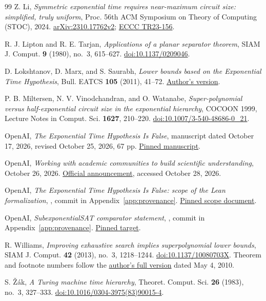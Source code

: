 \documentclass[11pt,reqno]{amsart}
\numberwithin{equation}{section}
\theoremstyle{plain}
\theoremstyle{definition}
\theoremstyle{remark}
\begin{document}
\begin{thebibliography}{99}
Z. Li, \emph{Symmetric exponential time requires near-maximum circuit size:
simplified, truly uniform}, Proc. 56th ACM Symposium on Theory of Computing
(STOC), 2024.
\href{https://arxiv.org/abs/2310.17762v2}{arXiv:2310.17762v2};
\href{https://eccc.weizmann.ac.il/report/2023/156/}{ECCC TR23-156}.

R. J. Lipton and R. E. Tarjan, \emph{Applications of a planar separator
theorem}, SIAM J. Comput. \textbf{9} (1980), no.~3, 615--627.
\href{https://doi.org/10.1137/0209046}{doi:10.1137/0209046}.

D. Lokshtanov, D. Marx, and S. Saurabh, \emph{Lower bounds based on the
Exponential Time Hypothesis}, Bull. EATCS \textbf{105} (2011), 41--72.
\href{https://sites.cs.ucsb.edu/~daniello/papers/surveyETH.pdf}{Author's version}.

P. B. Miltersen, N. V. Vinodchandran, and O. Watanabe,
\emph{Super-polynomial versus half-exponential circuit size in the
exponential hierarchy}, COCOON 1999, Lecture Notes in Comput. Sci.
\textbf{1627}, 210--220.
\href{https://doi.org/10.1007/3-540-48686-0_21}{doi:10.1007/3-540-48686-0\_21}.

OpenAI, \emph{The Exponential Time Hypothesis Is False}, manuscript dated
October 17, 2026, revised October 25, 2026, 67 pp.
\href{https://github.com/openai/math/blob/7ef5c0cc5ca4b0e072b7a050fca09ab24bc6fa3a/preprints/The-Exponential-Time-Hypothesis-is-False-October-25-2026/paper.pdf}{Pinned manuscript}.

OpenAI, \emph{Working with academic communities to build scientific
understanding}, October 26, 2026.
\href{https://openai.com/index/building-scientific-understanding-with-academic-communities/}{Official announcement},
accessed October 28, 2026.

OpenAI, \emph{The Exponential Time Hypothesis Is False: scope of the Lean
formalization}, , commit in Appendix~\ref{app:provenance}.
\href{https://github.com/openai/math/blob/7ef5c0cc5ca4b0e072b7a050fca09ab24bc6fa3a/lean/docs/378.md}{Pinned scope document}.

OpenAI, \emph{SubexponentialSAT comparator statement},
, commit in
Appendix~\ref{app:provenance}.
\href{https://github.com/openai/math/blob/7ef5c0cc5ca4b0e072b7a050fca09ab24bc6fa3a/lean/ComparatorChallenges/SubexponentialSAT.lean}{Pinned target}.

R. Williams, \emph{Improving exhaustive search implies superpolynomial lower
bounds}, SIAM J. Comput. \textbf{42} (2013), no.~3, 1218--1244.
\href{https://doi.org/10.1137/10080703X}{doi:10.1137/10080703X}.
Theorem and footnote numbers follow the
\href{https://www.cs.cmu.edu/~ryanw/improved-algs-lbs2.pdf}{author's full
version} dated May 4, 2010.

S. \v{Z}\'ak, \emph{A Turing machine time hierarchy}, Theoret. Comput. Sci.
\textbf{26} (1983), no.~3, 327--333.
\href{https://doi.org/10.1016/0304-3975(83)90015-4}{doi:10.1016/0304-3975(83)90015-4}.
\end{thebibliography}
\end{document}
